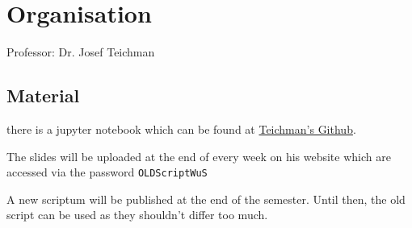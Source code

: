 \section*{Organisation}

Professor: Dr. Josef Teichman

\subsection*{Material}

there is a jupyter notebook which can be found at \href{https://gist.github.com/jteichma/a9c2621e0a27faf1b8a885c039120778}{Teichman's Github}.

The slides will be uploaded at the end of every week on his website which are accessed via the password \texttt{OLDScriptWuS}

A new scriptum will be published at the end of the semester. Until then, the old script can be used as they shouldn't differ too much.

